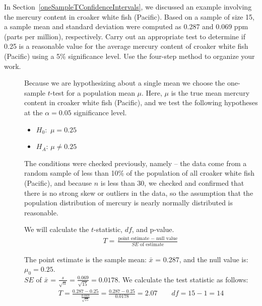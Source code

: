 \begin{examplewrap}
\begin{nexample}
{In Section~\ref{oneSampleTConfidenceIntervals}, we discussed an example involving the mercury content in croaker white fish (Pacific). Based on a sample of size 15, a sample mean and standard deviation were computed as 0.287 and 0.069 ppm (parts per million), respectively. Carry out an appropriate test to determine if 0.25 is a reasonable value for the average mercury content of croaker white fish (Pacific) using a 5\% significance level. Use the four-step method to organize your work.}

\begin{description}
\item[]  Because we are hypothesizing about a single mean we choose the one-sample $t$-test for a population mean $\mu$.  Here, $\mu$ is the true mean mercury content in croaker white fish (Pacific), and we test the following hypotheses at the $\alpha=0.05$ significance level.\vspace{-1mm}
\begin{itemize}
\setlength{\itemsep}{0mm}
\item[]  $H_0$: \,$\mu=0.25$   
\item[] $H_A$: $\mu \ne 0.25$ 
\end{itemize}
 \item[]  The conditions were checked previously, namely -- the data come from a random sample of less than 10\% of the population of all croaker white fish (Pacific), and because $n$ is less than 30, we checked and confirmed that there is no strong skew or outliers in the data, so the assumption that the population distribution of mercury is nearly normally distributed is reasonable.  
\item[  ]  We will calculate the $t$-statistic, $df$, and p-value.
\begin{align*}
T = \frac{\text{point estimate } - \text{ null value}}{SE \text{ of estimate}}
\end{align*}

The point estimate is the sample mean: $\bar{x}$ =  0.287, and the null value is: $\mu_0=0.25$.\\

$SE$ of $\bar{x}$ =  $\frac{s}{\sqrt{n}} = \frac{0.069}{\sqrt{15}} = 0.0178$.  We calculate the test statistic as follows:
\begin{align*}
T = \frac{0.287 - 0.25}{\frac{0.069}{\sqrt{15}}}  = \frac{0.287 - 0.25}{0.0178} = 2.07 \qquad df= 15-1=14
\end{align*}


\end{description}
\end{nexample}
\end{examplewrap}

